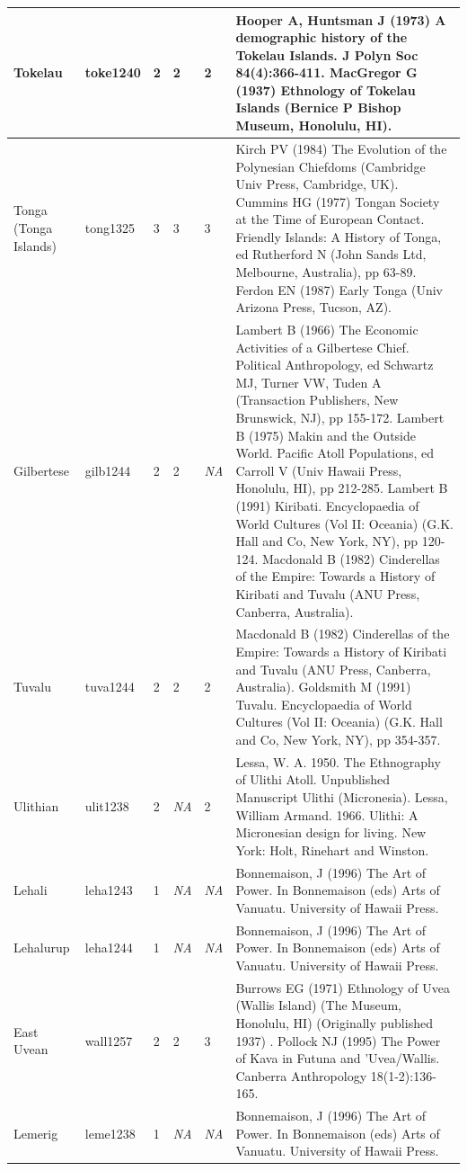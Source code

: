 \documentclass[draft,10pt]{article} %
\begin{document}
\begin{landscape}
\begin{longtable}{ | p{2cm}| p{2cm}| p{1.8cm}| p{1.8cm}| p{3cm}| p{9cm}| }
Tokelau&toke1240&2&2&2&Hooper A, Huntsman J (1973) A demographic history of the Tokelau Islands. J Polyn Soc 84(4):366-411. MacGregor G (1937) Ethnology of Tokelau Islands (Bernice P Bishop Museum, Honolulu, HI). \\ \hline
Tonga (Tonga Islands)&tong1325&3&3&3&Kirch PV (1984) The Evolution of the Polynesian Chiefdoms (Cambridge Univ Press, Cambridge, UK). Cummins HG (1977) Tongan Society at the Time of European Contact. Friendly Islands: A History of Tonga, ed Rutherford N (John Sands Ltd, Melbourne, Australia), pp 63-89. Ferdon EN (1987) Early Tonga (Univ Arizona Press, Tucson, AZ). \\ \hline
Gilbertese&gilb1244&2&2&\emph{NA}&Lambert B (1966) The Economic Activities of a Gilbertese Chief. Political Anthropology, ed Schwartz MJ, Turner VW, Tuden A (Transaction Publishers, New Brunswick, NJ), pp 155-172. Lambert B (1975) Makin and the Outside World. Pacific Atoll Populations, ed Carroll V (Univ Hawaii Press, Honolulu, HI), pp 212-285. Lambert B (1991) Kiribati. Encyclopaedia of World Cultures (Vol II: Oceania) (G.K. Hall and Co, New York, NY), pp 120-124. Macdonald B (1982) Cinderellas of the Empire: Towards a History of Kiribati and Tuvalu (ANU Press, Canberra, Australia). \\ \hline
Tuvalu&tuva1244&2&2&2&Macdonald B (1982) Cinderellas of the Empire: Towards a History of Kiribati and Tuvalu (ANU Press, Canberra, Australia). Goldsmith M (1991) Tuvalu. Encyclopaedia of World Cultures (Vol II: Oceania) (G.K. Hall and Co, New York, NY), pp 354-357.\\ \hline
Ulithian&ulit1238&2&\emph{NA}&2&Lessa, W. A. 1950. The Ethnography of Ulithi Atoll. Unpublished Manuscript Ulithi (Micronesia). Lessa, William Armand. 1966. Ulithi: A Micronesian design for living. New York: Holt, Rinehart and Winston.\\ \hline
Lehali&leha1243&1&\emph{NA}&\emph{NA}&Bonnemaison, J (1996) The Art of Power. In Bonnemaison (eds) Arts of Vanuatu. University of Hawaii Press.\\ \hline
Lehalurup&leha1244&1&\emph{NA}&\emph{NA}&Bonnemaison, J (1996) The Art of Power. In Bonnemaison (eds) Arts of Vanuatu. University of Hawaii Press.\\ \hline
East Uvean&wall1257&2&2&3&Burrows EG (1971) Ethnology of Uvea (Wallis Island) (The Museum, Honolulu, HI) (Originally published 1937) . Pollock NJ (1995) The Power of Kava in Futuna and 'Uvea/Wallis. Canberra Anthropology 18(1-2):136-165. \\ \hline
Lemerig&leme1238&1&\emph{NA}&\emph{NA}&Bonnemaison, J (1996) The Art of Power. In Bonnemaison (eds) Arts of Vanuatu. University of Hawaii Press.\\ \hline

\end{longtable}
\end{landscape}
\end{document}
